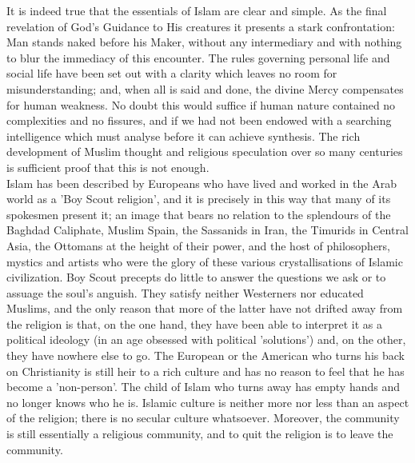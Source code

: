 \documentclass[10pt, twoside,openright]{book}
\begin{document}
It is indeed true that the essentials of Islam are clear and simple. As the final revelation of God's Guidance to His creatures it presents a stark confrontation: Man stands naked before his Maker, without any intermediary and with nothing to blur the immediacy of this encounter. The rules governing personal life and social life have been set out with a clarity which leaves no room for misunderstanding; and, when all is said and done, the divine Mercy compensates for human weakness. No doubt this would suffice if human nature contained no complexities and no fissures, and if we had not been endowed with a searching intelligence which must analyse before it can achieve synthesis. The rich development of Muslim thought and religious speculation over so many centuries is sufficient proof that this is not enough. \\

Islam has been described by Europeans who have lived and worked in the Arab world as a 'Boy Scout religion', and it is precisely in this way that many of its spokesmen present it; an image that bears no relation to the splendours of the Baghdad Caliphate, Muslim Spain, the Sassanids in Iran, the Timurids in Central Asia, the Ottomans at the height of their power, and the host of philosophers, mystics and artists who were the glory of these various crystallisations of Islamic civilization. Boy Scout precepts do little to answer the questions we ask or to assuage the soul's anguish. They satisfy neither Westerners nor educated Muslims, and the only reason that more of the latter have not drifted away from the religion is that, on the one hand, they have been able to interpret it as a political ideology (in an age obsessed with political 'solutions') and, on the other, they have nowhere else to go. The European or the American who turns his back on Christianity is still heir to a rich culture and has no reason to feel that he has become a 'non\hyp{}person'. The child of Islam who turns away has empty hands and no longer knows who he is. Islamic culture is neither more nor less than an aspect of the religion; there is no secular culture whatsoever. Moreover, the community is still essentially a religious community, and to quit the religion is to leave the community. \\
\end{document}
